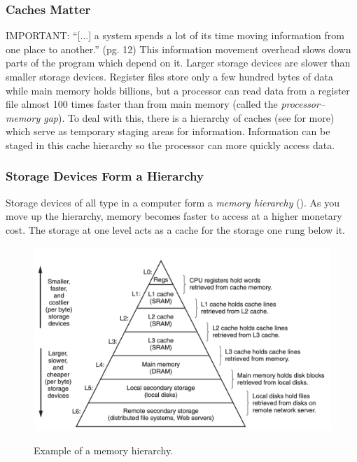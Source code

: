 \documentclass[../bryant_comp_sys.tex]{subfiles}
\begin{document}
        \subsubsection{Caches Matter}
            \begin{outline}
                \1 IMPORTANT: ``[...] a system spends a lot of its time moving information from one place to another.'' (pg. 12)
                \1 This information movement overhead slows down parts of the program which depend on it.
                \1 Larger storage devices are slower than smaller storage devices.
                \1 Register files store only a few hundred bytes of data while main memory holds billions, but a processor can read data from a register file almost 100 times faster than from main memory (called the \textit{processor--memory gap}).
                \1 To deal with this, there is a hierarchy of \glspl{cache} (see  for more) which serve as temporary staging areas for information.
                \1 Information can be staged in this cache hierarchy so the processor can more quickly access data.
            \end{outline}

        \subsubsection{Storage Devices Form a Hierarchy}
            \begin{outline}
                \1 Storage devices of all type in a computer form a \textit{memory hierarchy} ().
                \1 As you move up the hierarchy, memory becomes faster to access at a higher monetary cost.
                \1 The storage at one level acts as a cache for the storage one rung below it.
            \end{outline}

            \begin{figure}
                \centering
                \includegraphics[width=0.5\linewidth]{ch1/figs/mem_hierarchy.png}
                \label{fig:mem_hierarchy}
                \caption{Example of a memory hierarchy.}
            \end{figure}
\end{document}
